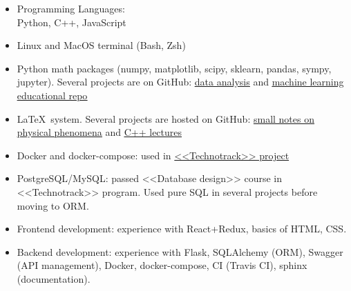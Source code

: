 \begin{itemize}
	\item Programming Languages: \\ 
	Python, C++, JavaScript
	\item Linux and MacOS terminal (Bash, Zsh)
	\item Python math packages 
	(numpy, matplotlib, scipy, sklearn, pandas, sympy, jupyter). Several projects are on GitHub: \href{https://github.com/alekseik1/phys\_labs}{\underline{data analysis}} and \href{https://github.com/alekseik1/machine\_learning\_coursera}{\underline{machine learning educational repo}}
	\item LaTeX~system. Several projects are hosted on GitHub: \href{https://github.com/alekseik1/quest\_on\_choice}{\underline{small notes on physical phenomena}} and \href{https://github.com/alekseik1/cpp\_mipt\_study}{\underline{C++ lectures}}
    \item Docker and docker-compose: used in \href{https://github.com/alekseik1/tt-ridesharing-backend/tree/feat/docker}{<<Technotrack>> project}
    \item PostgreSQL/MySQL: passed <<Database design>> course in <<Technotrack>> program. Used pure SQL in several projects before moving to ORM.
    \item Frontend development: experience with React+Redux, basics of HTML, CSS.
    \item Backend development: experience with Flask, SQLAlchemy (ORM), Swagger (API management), Docker, docker-compose, CI (Travis CI), sphinx (documentation).
\end{itemize}




